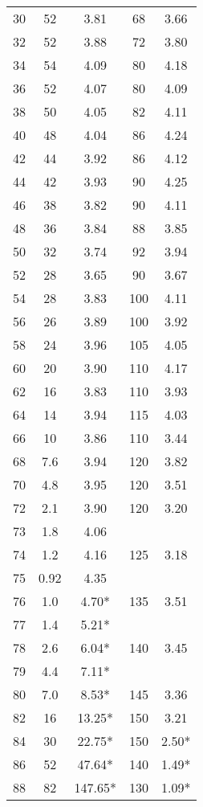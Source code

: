 \begin{table}
\begin{longtable}{S[table-format = 2.0] | c S[table-format = 3.2] | c S[table-format = 1.2]}
        30 & 52  &   3.81  & 68  & 3.66  \\
        32 & 52  &   3.88  & 72  & 3.80  \\
        34 & 54  &   4.09  & 80  & 4.18  \\
        36 & 52  &   4.07  & 80  & 4.09  \\
        38 & 50  &   4.05  & 82  & 4.11  \\
        40 & 48  &   4.04  & 86  & 4.24  \\
        42 & 44  &   3.92  & 86  & 4.12  \\
        44 & 42  &   3.93  & 90  & 4.25  \\
        46 & 38  &   3.82  & 90  & 4.11  \\
        48 & 36  &   3.84  & 88  & 3.85  \\
        50 & 32  &   3.74  & 92  & 3.94  \\
        52 & 28  &   3.65  & 90  & 3.67  \\
        54 & 28  &   3.83  & 100 & 4.11  \\
        56 & 26  &   3.89  & 100 & 3.92  \\
        58 & 24  &   3.96  & 105 & 4.05  \\
        60 & 20  &   3.90  & 110 & 4.17  \\
        62 & 16  &   3.83  & 110 & 3.93  \\
        64 & 14  &   3.94  & 115 & 4.03  \\
        66 & 10  &   3.86  & 110 & 3.44  \\
        68 & 7.6 &   3.94  & 120 & 3.82  \\
        70 & 4.8 &   3.95  & 120 & 3.51  \\
        72 & 2.1 &   3.90  & 120 & 3.20  \\
        73 & 1.8 &   4.06  &     &       \\
        74 & 1.2 &   4.16  & 125 & 3.18  \\
        75 & 0.92&   4.35  &     &       \\
        76 & 1.0 &   4.70* & 135 & 3.51  \\
        77 & 1.4 &   5.21* &     &       \\
        78 & 2.6 &   6.04* & 140 & 3.45  \\
        79 & 4.4 &   7.11* &     &       \\
        80 & 7.0 &   8.53* & 145 & 3.36  \\ 
        82 & 16  &  13.25* & 150 & 3.21  \\     
        84 & 30  &  22.75* & 150 & 2.50* \\    
        86 & 52  &  47.64* & 140 & 1.49* \\    
        88 & 82  & 147.65* & 130 & 1.09* \\    
    \bottomrule
  \end{longtable}
\end{table}

